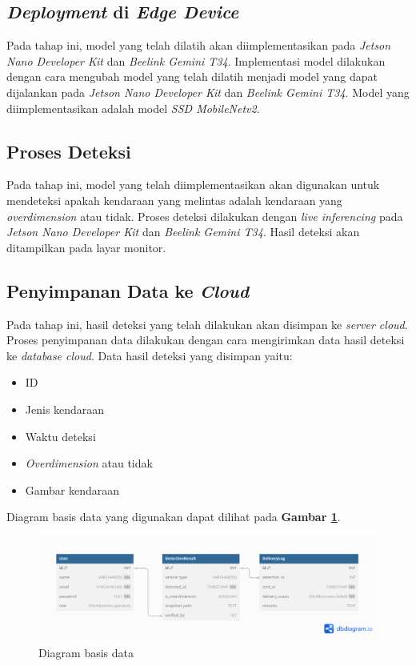 \subsection{\emph{Deployment} di \emph{Edge Device}}

Pada tahap ini, model yang telah dilatih akan diimplementasikan pada \emph{Jetson Nano Developer Kit} dan \emph{Beelink Gemini T34}. Implementasi model dilakukan dengan cara mengubah model yang telah dilatih menjadi model yang dapat dijalankan pada \emph{Jetson Nano Developer Kit} dan \emph{Beelink Gemini T34}. Model yang diimplementasikan adalah model \emph{SSD MobileNetv2}.

\subsection{Proses Deteksi}

Pada tahap ini, model yang telah diimplementasikan akan digunakan untuk mendeteksi apakah kendaraan yang melintas adalah kendaraan yang \emph{overdimension} atau tidak. Proses deteksi dilakukan dengan \emph{live inferencing} pada \emph{Jetson Nano Developer Kit} dan \emph{Beelink Gemini T34}. Hasil deteksi akan ditampilkan pada layar monitor.

\subsection{Penyimpanan Data ke \emph{Cloud}}

Pada tahap ini, hasil deteksi yang telah dilakukan akan disimpan ke \emph{server cloud}. Proses penyimpanan data dilakukan dengan cara mengirimkan data hasil deteksi ke \emph{database cloud}. Data hasil deteksi yang disimpan yaitu:

\begin{itemize}[noitemsep,nolistsep]

  \setlength{\itemsep}{8pt}
  \setlength{\parskip}{8pt}
  \setlength{\parsep}{0pt}
  \item ID
  \item Jenis kendaraan
  \item Waktu deteksi
  \item \emph{Overdimension} atau tidak
  \item Gambar kendaraan
\end{itemize}

Diagram basis data yang digunakan dapat dilihat pada \textbf{Gambar \ref{fig:dbdiagram}}.

\begin{figure}[H]
  \centering

  \includegraphics[scale=0.39]{gambar/bab3-basis-data.png}

  \caption{Diagram basis data}
  \label{fig:dbdiagram}
\end{figure}

